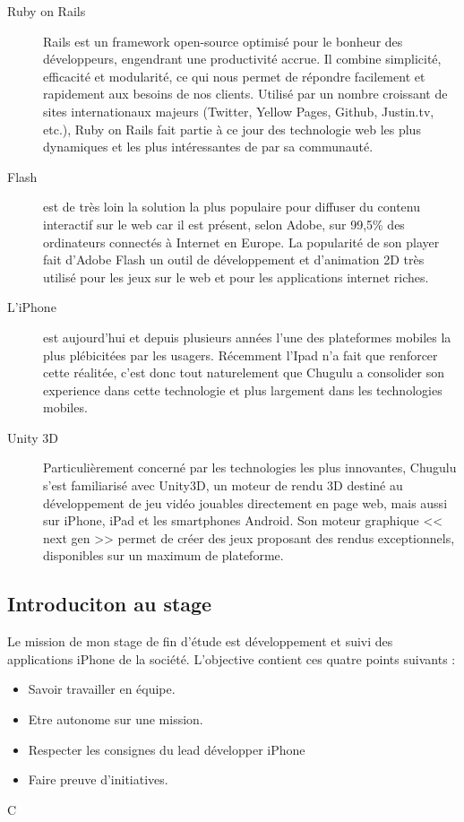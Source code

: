 \begin{description}
	\item[Ruby on Rails] Rails est un framework open-source optimisé pour le bonheur des développeurs, engendrant une productivité accrue. Il combine simplicité, efficacité et modularité, ce qui nous permet de répondre facilement et rapidement aux besoins de nos clients. Utilisé par un nombre croissant de sites internationaux majeurs (Twitter, Yellow Pages, Github, Justin.tv, etc.), Ruby on Rails fait partie à ce jour des technologie web les plus dynamiques et les plus intéressantes de par sa communauté.
	\item[Flash] est de très loin la solution la plus populaire pour diffuser du contenu interactif sur le web car il est présent, selon Adobe, sur 99,5\% des ordinateurs connectés à Internet en Europe. La popularité de son player fait d’Adobe Flash un outil de développement et d’animation 2D très utilisé pour les jeux sur le web et pour les applications internet riches.
	\item[L'iPhone] est aujourd'hui et depuis plusieurs années l'une des plateformes mobiles la plus plébicitées par les usagers. Récemment l'Ipad n'a fait que renforcer cette réalitée, c'est donc tout naturelement que Chugulu a consolider son experience dans cette technologie et plus largement dans les technologies mobiles.
	\item[Unity 3D] Particulièrement concerné par les technologies les plus innovantes, Chugulu s’est familiarisé avec Unity3D, un moteur de rendu 3D destiné au développement de jeu vidéo jouables directement en page web, mais aussi sur iPhone, iPad et les smartphones Android. Son moteur graphique << next gen >> permet de créer des jeux proposant des rendus exceptionnels, disponibles sur un maximum de plateforme.
\end{description}



\subsection{Introduciton au stage} %
Le mission de mon stage de fin d'étude est développement et suivi des applications iPhone de la société. L'objective contient ces quatre points suivants : 

\begin{itemize}
	\item Savoir travailler en équipe.
	\item Etre autonome sur une mission.
	\item Respecter les consignes du lead développer iPhone
	\item Faire preuve d'initiatives.
\end{itemize}

C




